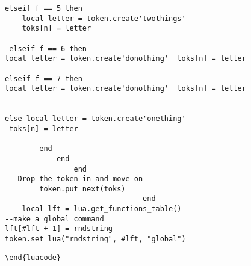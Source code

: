\documentclass{article}
\begin{document}
\begin{verbatim}
elseif f == 5 then
	local letter = token.create'twothings' 
	toks[n] = letter
               
 elseif f == 6 then
local letter = token.create'donothing'  toks[n] = letter

elseif f == 7 then
local letter = token.create'donothing'  toks[n] = letter


else local letter = token.create'onething'
 toks[n] = letter
 
		end
			end
				end
 --Drop the token in and move on
        token.put_next(toks)
								end
	local lft = lua.get_functions_table()
--make a global command
lft[#lft + 1] = rndstring
token.set_lua("rndstring", #lft, "global")
\end{verbatim}
\begin{verbatim}
\end{luacode}
\end{verbatim}


	
\end{document}
